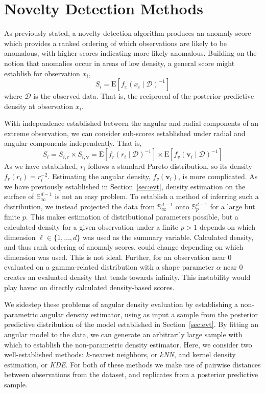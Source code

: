 \section{Novelty Detection Methods\label{sec:novelty}}
As previously stated, a novelty detection algorithm produces an anomaly score 
    which provides a ranked ordering of which observations are likely to be 
    anomalous, with higher scores indicating more likely anomalous. Building on 
    the notion that anomalies occur in areas of low density, a general score 
    might establish for observation $x_i$, 
    \[S_i = \text{E}\left[f_{x}(x_i\mid\mathcal{D})^{-1}\right]\]
    where $\mathcal{D}$ is the observed data.  That is, the reciprocal of the 
    posterior predictive density at observation $x_i$.

With independence established between the angular and radial components of an
    extreme observation, we can consider sub-scores established under radial 
    and angular components independently.  That is,
    \[
        S_i = S_{i,r}\times S_{i,\bm{v}} = 
            \text{E}\left[f_r(r_i\mid\mathcal{D})^{-1}\right]\times
            \text{E}\left[f_v(\bm{v}_i\mid\mathcal{D})^{-1}\right]
    \]
    As we have established, $r_i$ follows a standard Pareto distribution, so its
    density $f_r(r_i) = r_i^{-2}$.  Estimating the angular density, 
    $f_v(\bm{v}_i)$, is more complicated.  As we have previously established in
    Section~\ref{sec:evt}, density estimation on the surface of 
    ${\mathbb S}_{\infty}^{d-1}$ is not an easy problem. To establish a method
    of inferring such a distribution, we instead projected the data from 
    $\mathbb{S}_{\infty}^{d-1}$ onto $\mathbb{S}_p^{d-1}$ for a large but finite
    $p$.  This makes estimation of distributional parameters possible, but a
    calculated density for a given observation under a finite $p > 1$ depends on
    which dimension $\ell \in \lbrace 1,\ldots,d\rbrace$ was used as the summary
    variable.  Calculated density, and thus rank ordering of anomaly scores,
    could change depending on which dimension was used.  This is not ideal.
    Further, for an observation near 0 evaluated on a gamma-related distribution 
    with a shape parameter $\alpha$ near 0 creates an evaluated density that 
    tends towards infinity.  This instability would play havoc on directly 
    calculated density-based scores.

We sidestep these problems of angular density evaluation by establishing a 
    non-parametric angular density estimator, using as input a sample from the 
    posterior predictive distribution of the model established in 
    Section~\ref{sec:evt}. By fitting an angular model to the data, we can 
    generate an arbitrarily large sample with which to establish the 
    non-parametric density estimator.  Here, we consider two well-established
    methods: $k$-nearest neighbors, or \emph{$k$NN}, and 
    kernel density estimation, or \emph{KDE}.  For both of these methods we make
    use of pairwise distances between observations from the dataset, and
    replicates from a posterior predictive sample.  


